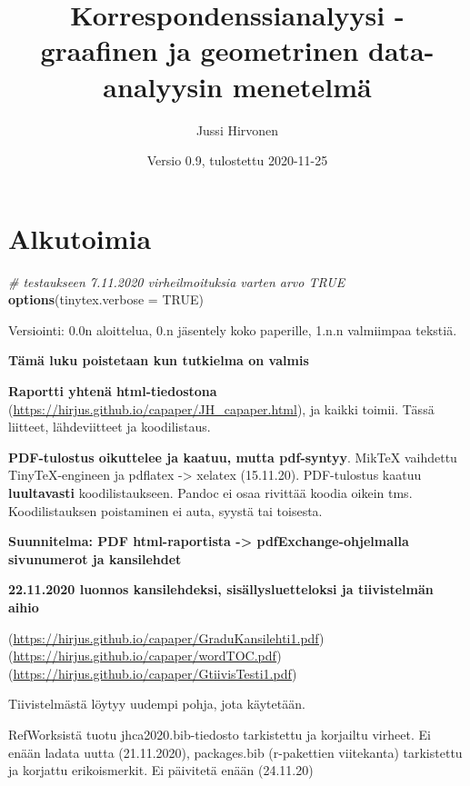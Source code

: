 \documentclass[
  finnish,
]{book}
\title{Korrespondenssianalyysi - graafinen ja geometrinen data-analyysin menetelmä}
\author{Jussi Hirvonen}
\date{Versio 0.9, tulostettu 2020-11-25}
\newenvironment{Shaded}{\begin{snugshade}}{\end{snugshade}}
\newcommand{\CommentTok}[1]{\textcolor[rgb]{0.56,0.35,0.01}{\textit{#1}}}
\newcommand{\DataTypeTok}[1]{\textcolor[rgb]{0.13,0.29,0.53}{#1}}
\newcommand{\KeywordTok}[1]{\textcolor[rgb]{0.13,0.29,0.53}{\textbf{#1}}}
\newcommand{\NormalTok}[1]{#1}
\newcommand{\OtherTok}[1]{\textcolor[rgb]{0.56,0.35,0.01}{#1}}
\begin{document}
\maketitle

{
\setcounter{tocdepth}{1}
\tableofcontents
}
\hypertarget{alkutoimia}{%
\chapter*{Alkutoimia}\label{alkutoimia}}

\begin{Shaded}
\begin{Highlighting}[]
\CommentTok{# testaukseen 7.11.2020 virheilmoituksia varten arvo TRUE}
\KeywordTok{options}\NormalTok{(}\DataTypeTok{tinytex.verbose =} \OtherTok{TRUE}\NormalTok{)}
\end{Highlighting}
\end{Shaded}

Versiointi: 0.0n aloittelua, 0.n jäsentely koko paperille, 1.n.n valmiimpaa tekstiä.

\textbf{Tämä luku poistetaan kun tutkielma on valmis}

\textbf{Raportti yhtenä html-tiedostona} (\url{https://hirjus.github.io/capaper/JH_capaper.html}), ja kaikki toimii.
Tässä liitteet, lähdeviitteet ja koodilistaus.

\textbf{PDF-tulostus oikuttelee ja kaatuu, mutta pdf-syntyy}. MikTeX vaihdettu TinyTeX-engineen
ja pdflatex -\textgreater{} xelatex (15.11.20). PDF-tulostus kaatuu \textbf{luultavasti} koodilistaukseen.
Pandoc ei osaa rivittää koodia oikein tms. Koodilistauksen poistaminen ei auta, syystä tai toisesta.

\textbf{Suunnitelma: PDF html-raportista -\textgreater{} pdfExchange-ohjelmalla sivunumerot ja kansilehdet}

\textbf{22.11.2020 luonnos kansilehdeksi, sisällysluetteloksi ja tiivistelmän aihio}

(\url{https://hirjus.github.io/capaper/GraduKansilehti1.pdf})
(\url{https://hirjus.github.io/capaper/wordTOC.pdf})
(\url{https://hirjus.github.io/capaper/GtiivisTesti1.pdf})

Tiivistelmästä löytyy uudempi pohja, jota käytetään.

RefWorksistä tuotu jhca2020.bib-tiedosto tarkistettu ja korjailtu virheet. Ei enään ladata uutta (21.11.2020),
packages.bib (r-pakettien viitekanta) tarkistettu ja korjattu erikoismerkit. Ei päivitetä enään (24.11.20)
\end{document}
